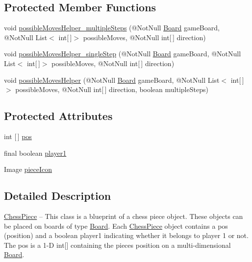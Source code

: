 \subsection*{Protected Member Functions}
\begin{DoxyCompactItemize}
\item 
void \mbox{\hyperlink{class_chess_piece_a4312cb057bd63c4e10d26e3e53b2aed0}{possible\+Moves\+Helper\+\_\+multiple\+Steps}} (@Not\+Null \mbox{\hyperlink{class_board}{Board}} game\+Board, @Not\+Null List$<$ int\mbox{[}$\,$\mbox{]}$>$ possible\+Moves, @Not\+Null int\mbox{[}$\,$\mbox{]} direction)
\item 
void \mbox{\hyperlink{class_chess_piece_af64f08ba2e875b12655778ff751c8c74}{possible\+Moves\+Helper\+\_\+single\+Step}} (@Not\+Null \mbox{\hyperlink{class_board}{Board}} game\+Board, @Not\+Null List$<$ int\mbox{[}$\,$\mbox{]}$>$ possible\+Moves, @Not\+Null int\mbox{[}$\,$\mbox{]} direction)
\item 
void \mbox{\hyperlink{class_chess_piece_a10df0b9d4c1bf1545b58c2dc9d083f48}{possible\+Moves\+Helper}} (@Not\+Null \mbox{\hyperlink{class_board}{Board}} game\+Board, @Not\+Null List$<$ int\mbox{[}$\,$\mbox{]}$>$ possible\+Moves, @Not\+Null int\mbox{[}$\,$\mbox{]} direction, boolean multiple\+Steps)
\end{DoxyCompactItemize}
\subsection*{Protected Attributes}
\begin{DoxyCompactItemize}
\item 
int \mbox{[}$\,$\mbox{]} \mbox{\hyperlink{class_chess_piece_ae9f0da2b5fca2557eab359044a7ba1ac}{pos}}
\item 
final boolean \mbox{\hyperlink{class_chess_piece_aa8711ff5ce8a45159b9b30c8148a34b2}{player1}}
\item 
Image \mbox{\hyperlink{class_chess_piece_a3216dcf60a0092d90e7a0449bc46db9d}{piece\+Icon}}
\end{DoxyCompactItemize}


\subsection{Detailed Description}
\mbox{\hyperlink{class_chess_piece}{Chess\+Piece}} -- This class is a blueprint of a chess piece object. These objects can be placed on boards of type \textquotesingle{}\mbox{\hyperlink{class_board}{Board}}\textquotesingle{}. Each \mbox{\hyperlink{class_chess_piece}{Chess\+Piece}} object contains a pos (position) and a boolean \textquotesingle{}player1\textquotesingle{} indicating whether it belongs to player 1 or not. The \textquotesingle{}pos\textquotesingle{} is a 1-\/D int\mbox{[}\mbox{]} containing the piece\textquotesingle{}s position on a multi-\/dimensional \mbox{\hyperlink{class_board}{Board}}.


